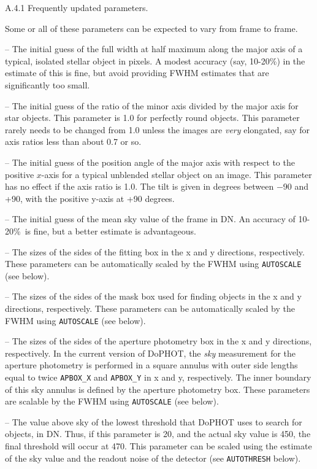 \centerline{A.4.1 Frequently updated parameters.}

Some or all of these parameters can be expected to vary from frame to frame.

 -- The initial guess of the 
full width at half maximum along the
major axis of a typical, isolated stellar object in pixels.  A modest
accuracy (say, 10-20\%) in the estimate of this is fine, but avoid 
providing FWHM estimates that are significantly too small.

 -- The initial guess of the
ratio of the minor axis divided by
the major axis for star objects.  This parameter is 1.0 for 
perfectly round objects.  This parameter rarely needs to be
changed from 1.0 unless the images are {\it very} elongated, say
for axis ratios less than about 0.7 or so.

 -- The initial guess of the position angle
of the major axis with respect to the positive $x$-axis 
for a typical unblended stellar object on an image.  This
parameter has no effect if the axis ratio is 1.0.  The tilt is
given in degrees between $-$90 and +90, with the positive
y-axis at +90 degrees.

 -- The initial guess of the mean sky value of
the frame in DN.  An accuracy of 10-20\%\ is fine, but 
a better estimate is advantageous.

 -- The sizes of the
sides of the fitting box
in the x and y directions, respectively.  These parameters can be 
automatically scaled
by the FWHM using {\tt AUTOSCALE} (see below).

 -- The sizes of the sides of
the mask box used for finding objects in the x and y directions,
respectively.  These parameters can be automatically scaled by
the FWHM using {\tt AUTOSCALE} (see below).

 -- The sizes of the sides of the
aperture photometry box in the x and y directions, respectively.  
In the current
version of DoPHOT, the {\it sky} measurement for the aperture
photometry is performed in a square annulus with outer side
lengths equal to twice {\tt APBOX\_X} and {\tt APBOX\_Y} in x and
y, respectively.  The inner boundary of this sky annulus is
defined by the aperture photometry box.  These parameters
are scalable by the FWHM using {\tt AUTOSCALE} (see below).

 -- The value above sky 
of the lowest threshold that
DoPHOT uses to search for objects, in DN.   Thus,
if this parameter is 20, and the actual sky value is
450, the final threshold will occur at 470.  This parameter
can be scaled using the estimate of the sky value and the
readout noise of the detector (see {\tt AUTOTHRESH} below).

